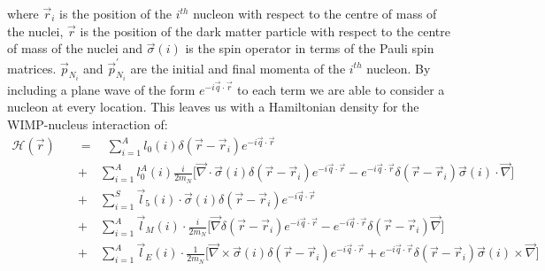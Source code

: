 where $\vec{r}_i$ is the position of the $i^{th}$ nucleon with respect to the centre of mass of the nuclei, $\vec{r}$ is the position of the dark matter particle with respect to the centre of mass of the nuclei and $\vec{\sigma}(i)$ is the spin operator in terms of the Pauli spin matrices.
$\vec{p}_{N_i}$ and $\vec{p}^{'}_{N_i}$ are the initial and final momenta of the $i^{th}$ nucleon.
By including a plane wave of the form $e^{-i \vec{q}\cdot \vec{r}}$ to each term we are able to consider a nucleon at every location.
This leaves us with a Hamiltonian density for the WIMP-nucleus interaction of:
\begin{equation}
\begin{split}
    \mathcal{H}(\vec{r})\quad  & =\quad \sum^{A}_{i=1} l_{0}(i) \delta(\vec{r} - \vec{r}_i) e^{-i\vec{q}\cdot \vec{r}} \\
                               & +\quad  \sum^{A}_{i=1} l^A_0 (i) \frac{i}{2m_N} \Bigg[ \vec{\nabla} \cdot \vec{\sigma}(i) \delta(\vec{r} - \vec{r}_i) e^{-i\vec{q}\cdot \vec{r}} - e^{-i\vec{q}\cdot \vec{r}} \delta(\vec{r} - \vec{r}_i) \vec{\sigma}(i) \cdot \vec{\nabla} \Bigg] \\
                               & +\quad  \sum^{S}_{i=1} \vec{l}_5 (i) \cdot \vec{\sigma}(i)\delta(\vec{r} - \vec{r}_i)e^{-i\vec{q}\cdot \vec{r}} \\
                               & +\quad  \sum^{A}_{i=1} \vec{l}_M (i) \cdot \frac{i}{2m_N} \Bigg[ \vec{\nabla} \delta(\vec{r} - \vec{r}_i)e^{-i\vec{q}\cdot \vec{r}} - e^{-i\vec{q}\cdot \vec{r}}\delta(\vec{r} - \vec{r}_i)\vec{\nabla} \Bigg] \\
                               & +\quad \sum^{A}_{i=1} \vec{l}_E (i) \cdot \frac{1}{2m_N} \Bigg[ \vec{\nabla} \times \vec{\sigma}(i)\delta(\vec{r} - \vec{r}_i)e^{-i\vec{q}\cdot \vec{r}} + e^{-i\vec{q}\cdot \vec{r}}\delta(\vec{r} - \vec{r}_i) \vec{\sigma}(i) \times \vec{\nabla} \Bigg]
\end{split}
\label{eq:eft_hamiltonian_density}
\end{equation}

